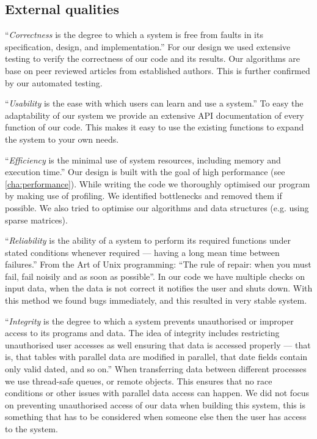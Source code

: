 \documentclass[a4paper, openany, oneside]{memoir}
\begin{document}
\subsection{External qualities}
``\textit{Correctness} is the degree to which a system is free from faults in its specification, design, and implementation.'' For our design we used extensive testing to verify the correctness of our code and its results. Our algorithms are base on peer reviewed articles from established authors. This is further confirmed by our automated testing.

``\textit{Usability} is the ease with which users can learn and use a system.'' To easy the adaptability of our system we provide an extensive API documentation of every function of our code. This makes it easy to use the existing functions to expand the system to your own needs.

``\textit{Efficiency} is the minimal use of system resources, including memory and execution time.'' Our design is built with the goal of high performance (see \cref{cha:performance}). While writing the code we thoroughly optimised our program by making use of profiling. We identified bottlenecks and removed them if possible. We also tried to optimise our algorithms and data structures (e.g. using sparse matrices).

``\textit{Reliability} is the ability of a system to perform its required functions under stated conditions whenever required --- having a long mean time between failures.'' From the Art of Unix programming\cite{raymond2003art}: ``The rule of repair: when you must fail, fail noisily and as soon as possible''. In our code we have multiple checks on input data, when the data is not correct it notifies the user and shuts down. With this method we found bugs immediately, and this resulted in very stable system.

``\textit{Integrity} is the degree to which a system prevents unauthorised or improper access to its programs and data. The idea of integrity includes restricting unauthorised user accesses as well ensuring that data is accessed properly --- that is, that tables with parallel data are modified in parallel, that date fields contain only valid dated, and so on.'' When transferring data between different processes we use thread-safe queues, or remote objects. This ensures that no race conditions or other issues with parallel data access can happen. We did not focus on preventing unauthorised access of our data when building this system, this is something that has to be considered when someone else then the user has access to the system.
\end{document}
